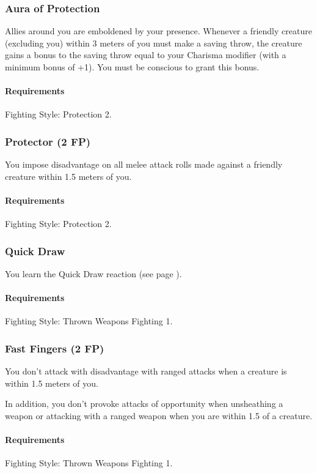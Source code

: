 \subsubsection{Aura of Protection} \label{feat::auraofprotection}
    Allies around you are emboldened by your presence.
    Whenever a friendly creature (excluding you) within 3 meters of you must make a saving throw, the creature gains a bonus to the saving throw equal to your Charisma modifier (with a minimum bonus of +1).
    You must be conscious to grant this bonus.
    \paragraph{Requirements} Fighting Style: Protection 2.
\subsubsection{Protector (2 FP)} \label{feat::protector}
    You impose disadvantage on all melee attack rolls made against a friendly creature within 1.5 meters of you.
    \paragraph{Requirements} Fighting Style: Protection 2.
\subsubsection{Quick Draw} \label{feat::quickdraw}
    You learn the Quick Draw reaction (see page \pageref{act::quickdraw}).
    \paragraph{Requirements} Fighting Style: Thrown Weapons Fighting 1.
\subsubsection{Fast Fingers (2 FP)} \label{feat::fastfingers}
    You don't attack with disadvantage with ranged attacks when a creature is within 1.5 meters of you.

    In addition, you don't provoke attacks of opportunity when unsheathing a weapon or attacking with a ranged weapon when you are within 1.5 of a creature.
    \paragraph{Requirements} Fighting Style: Thrown Weapons Fighting 1.
